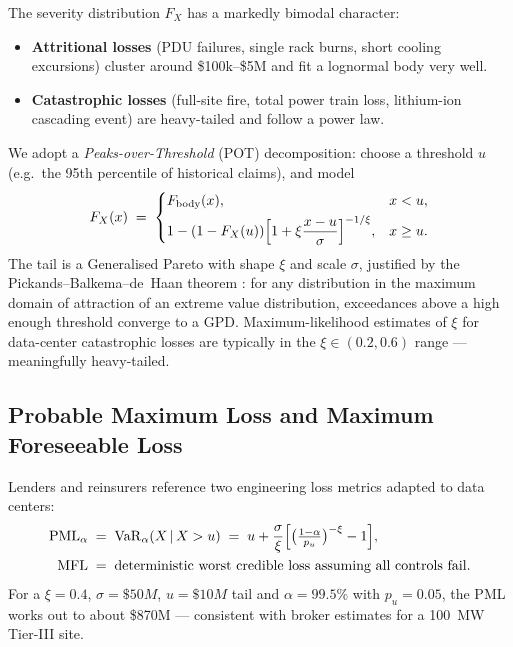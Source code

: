 \documentclass[11pt,a4paper]{article}
\theoremstyle{ia}
\newcommand{\1}{\mathbf{1}}
\newcommand{\VaR}{\operatorname{VaR}}
\newcommand{\given}{\,\vert\,}
\begin{document}
The severity distribution $F_X$ has a markedly bimodal character:
\begin{itemize}[leftmargin=*,nosep]
  \item \textbf{Attritional losses} (PDU failures, single rack burns,
        short cooling excursions) cluster around \$100k--\$5M and
        fit a lognormal body very well.
  \item \textbf{Catastrophic losses} (full-site fire, total power
        train loss, lithium-ion cascading event) are heavy-tailed and
        follow a power law.
\end{itemize}
We adopt a \emph{Peaks-over-Threshold} (POT) decomposition: choose a
threshold $u$ (e.g.\ the 95th percentile of historical claims), and model
\begin{equation}\label{eq:POT}
   F_X(x) \;=\;
   \begin{cases}
      F_{\mathrm{body}}(x), & x < u, \\[3pt]
      1 - (1-F_X(u))\Bigl[1 + \xi\dfrac{x-u}{\sigma}\Bigr]^{-1/\xi}, & x \geq u .
   \end{cases}
\end{equation}
The tail is a Generalised Pareto with shape $\xi$ and scale
$\sigma$, justified by the Pickands--Balkema--de~Haan theorem
\citep{Balkema1974,Pickands1975}: for any distribution in the maximum
domain of attraction of an extreme value distribution, exceedances
above a high enough threshold converge to a GPD. Maximum-likelihood
estimates of $\xi$ for data-center catastrophic losses are typically
in the $\xi\in(0.2,0.6)$ range --- meaningfully heavy-tailed.

\subsection{Probable Maximum Loss and Maximum Foreseeable Loss}

Lenders and reinsurers reference two engineering loss metrics adapted
to data centers:
\begin{align}
   \mathrm{PML}_\alpha &\;=\; \VaR_\alpha(X\given X>u)
   \;=\; u + \frac{\sigma}{\xi}
        \Bigl[\bigl(\tfrac{1-\alpha}{p_u}\bigr)^{-\xi}-1\Bigr], \label{eq:PML}\\
   \mathrm{MFL}      &\;=\; \text{deterministic worst credible loss assuming all controls fail.}
\end{align}
For a $\xi=0.4$, $\sigma=\$50M$, $u=\$10M$ tail and $\alpha=99.5\%$
with $p_u=0.05$, the PML works out to about \$870M --- consistent with
broker estimates for a \SI{100}{\mega\watt} Tier-III site.
\end{document}
